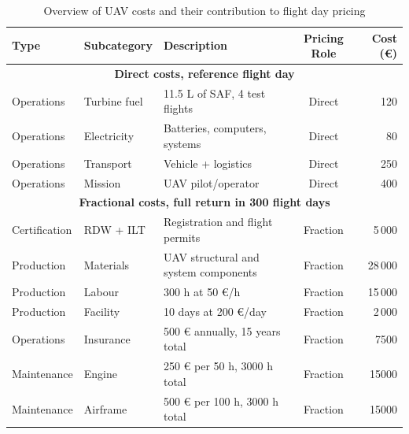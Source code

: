 \begin{table}[H]
    \centering
    \caption{Overview of UAV costs and their contribution to flight day pricing}
    \begin{tabular}{|l|l|l|c|r|}
        \hline
        \textbf{Type} & \textbf{Subcategory} & \textbf{Description} & \textbf{Pricing Role} & \textbf{Cost (€)} \\ \hline \hline
        
        \multicolumn{5}{|c|}{\textbf{Direct costs, reference flight day}} \\ \hline
        Operations & Turbine fuel & 11.5 L of SAF, 4 test flights & Direct & 120 \\ \hline
        Operations & Electricity & Batteries, computers, systems & Direct & 80 \\ \hline
        Operations & Transport & Vehicle + logistics & Direct & 250 \\ \hline
        Operations & Mission & UAV pilot/operator & Direct & 400 \\ \hline
        
        \multicolumn{5}{|c|}{\textbf{Fractional costs, full return in 300 flight days}} \\ \hline
        Certification & RDW + ILT & Registration and flight permits & Fraction & 5\,000 \\ \hline
        
        Production & Materials & UAV structural and system components & Fraction & 28\,000 \\ \hline
        Production & Labour & 300 h at 50 €/h & Fraction & 15\,000 \\ \hline
        Production & Facility & 10 days at 200 €/day & Fraction & 2\,000 \\ \hline
        
        Operations & Insurance & 500 € annually, 15 years total & Fraction & 7500 \\ \hline
        
        Maintenance & Engine & 250 € per 50 h, 3000 h total & Fraction & 15000 \\ \hline
        Maintenance & Airframe & 500 € per 100 h, 3000 h total & Fraction & 15000 \\ \hline
        
    \end{tabular}
      \label{tab:costs}
\end{table}

